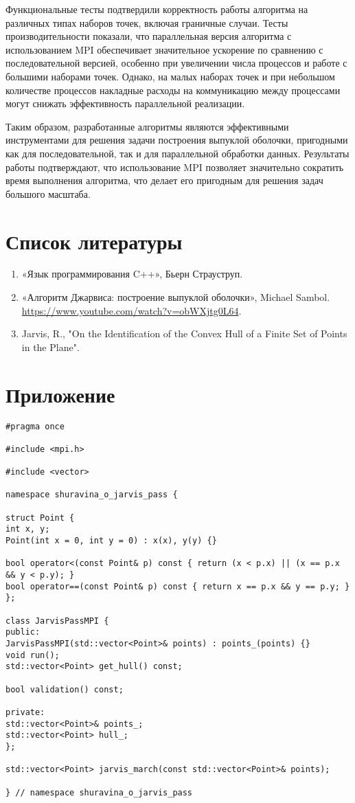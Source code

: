 \documentclass[12pt]{article}
\begin{document}
Функциональные тесты подтвердили корректность работы алгоритма на различных типах наборов точек, включая граничные случаи. Тесты производительности показали, что параллельная версия алгоритма с использованием MPI обеспечивает значительное ускорение по сравнению с последовательной версией, особенно при увеличении числа процессов и работе с большими наборами точек. Однако, на малых наборах точек и при небольшом количестве процессов накладные расходы на коммуникацию между процессами могут снижать эффективность параллельной реализации.

Таким образом, разработанные алгоритмы являются эффективными инструментами для решения задачи построения выпуклой оболочки, пригодными как для последовательной, так и для параллельной обработки данных. Результаты работы подтверждают, что использование MPI позволяет значительно сократить время выполнения алгоритма, что делает его пригодным для решения задач большого масштаба.

\newpage
\section*{Список литературы}

\begin{enumerate}
\item «Язык программирования C++», Бьерн Страуструп.
\item «Алгоритм Джарвиса: построение выпуклой оболочки», Michael Sambol.
\url {https://www.youtube.com/watch?v=obWXjtg0L64}.
\item Jarvis, R., "On the Identification of the Convex Hull of a Finite Set of Points in the Plane".
\end{enumerate}

\newpage
\section*{Приложение}

\begin{lstlisting}[caption={ops_mpi_.hpp}]
#pragma once

#include <mpi.h>

#include <vector>

namespace shuravina_o_jarvis_pass {

struct Point {
int x, y;
Point(int x = 0, int y = 0) : x(x), y(y) {}

bool operator<(const Point& p) const { return (x < p.x) || (x == p.x && y < p.y); }
bool operator==(const Point& p) const { return x == p.x && y == p.y; }
};

class JarvisPassMPI {
public:
JarvisPassMPI(std::vector<Point>& points) : points_(points) {}
void run();
std::vector<Point> get_hull() const;

bool validation() const;

private:
std::vector<Point>& points_;
std::vector<Point> hull_;
};

std::vector<Point> jarvis_march(const std::vector<Point>& points);

} // namespace shuravina_o_jarvis_pass
\end{lstlisting}
\end{document}
